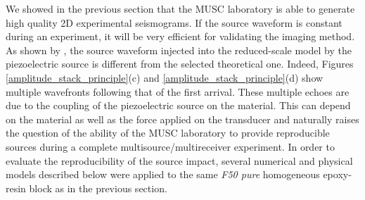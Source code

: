 \documentclass[manuscript,revised]{geophysics}
\begin{document}
\noindent We showed in the previous section that the MUSC laboratory is able to generate high quality 2D experimental seismograms. If the source waveform is constant during an experiment, it will be very efficient for validating the imaging method. As shown by \citet{Bretaudeau_SSM_2011}, the source waveform injected into the reduced-scale model by the piezoelectric source is different from the selected theoretical one. Indeed, Figures \ref{amplitude_stack_principle}(c) and \ref{amplitude_stack_principle}(d) show multiple wavefronts following that of the first arrival. These multiple echoes are due to the coupling of the piezoelectric source on the material. This can depend on the material as well as the force applied on the transducer and naturally raises the question of the ability of the MUSC laboratory to provide reproducible sources during a complete multisource/multireceiver experiment. In order to evaluate the reproducibility of the source impact, several numerical and physical models described below were applied to the same \textit{F50 pure} homogeneous epoxy-resin block as in the previous section.
\end{document}
